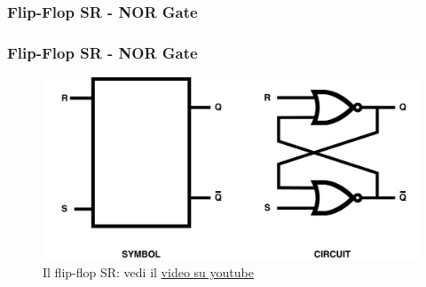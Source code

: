 \subsubsection[Flip-Flop SR - NOR Gate]{Flip-Flop SR - NOR Gate}
\begin{frame}
	\frametitle{Flip-Flop SR - NOR Gate}
	 
	\begin{figure}[!htbp] 
		\centering
		\includegraphics[width=0.95\linewidth]{images/5_memory/flip_flop_sr_nor.pdf}
		\caption{Il flip-flop SR: vedi il \underline{\href{https://www.youtube.com/watch?v=br2pbjAnP2k}{video su youtube}}}
	\end{figure}
	
\end{frame}
%
%	 
%	
%
%
%
%
%
%
